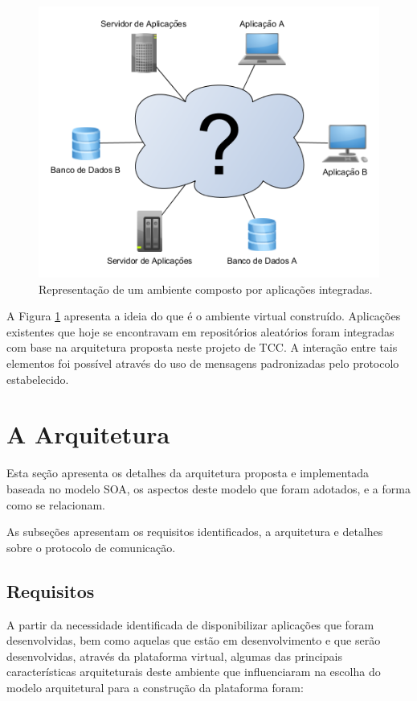 \begin{figure}[!hbt]
\centering
\includegraphics[scale=0.7]{figuras/ambiente_virtual.png}
\caption{Representação de um ambiente composto por aplicações integradas.}
\label{ambiente_virtual}
\end{figure}

A Figura \ref{ambiente_virtual} apresenta a ideia do que é o ambiente virtual construído. Aplicações existentes que hoje se encontravam em repositórios aleatórios foram integradas com base na arquitetura proposta neste projeto de TCC. A interação entre tais elementos foi possível através do uso de mensagens padronizadas pelo protocolo estabelecido.

\section{A Arquitetura}

Esta seção apresenta os detalhes da arquitetura proposta e implementada baseada no modelo SOA, os aspectos deste modelo que foram adotados, e a forma como se relacionam.

As subseções apresentam os requisitos identificados, a arquitetura e detalhes sobre o protocolo de comunicação.

\subsection{Requisitos}
A partir da necessidade identificada de disponibilizar aplicações que foram desenvolvidas, bem como aquelas que estão em desenvolvimento e que serão desenvolvidas, através da plataforma virtual, algumas das principais características arquiteturais deste ambiente que influenciaram na escolha do modelo arquitetural para a construção da plataforma foram:

